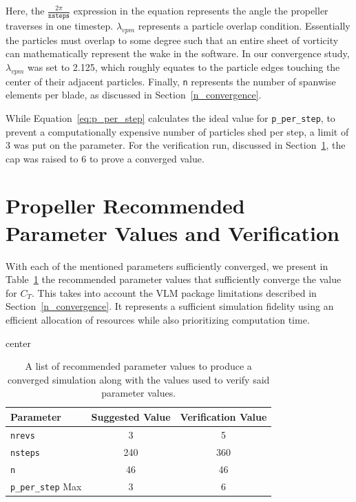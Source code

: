 \documentclass{report}
\begin{document}
Here, the $\frac{2 \pi}{\texttt{nsteps}}$ expression in the equation represents the angle the propeller traverses in one timestep.
$\lambda_{vpm}$ represents a particle overlap condition. Essentially the particles must overlap to some degree such that an entire sheet of vorticity can mathematically represent the wake in the software.
In our convergence study, $\lambda_{vpm}$ was set to 2.125, which roughly equates to the particle edges touching the center of their adjacent particles.
Finally, \texttt{n} represents the number of spanwise elements per blade, as discussed in Section~\ref{n_convergence}.

While Equation~\ref{eq:p_per_step} calculates the ideal value for \texttt{p\_per\_step}, to prevent a computationally expensive number of particles shed per step, a limit of 3 was put on the parameter.
For the verification run, discussed in Section~\ref{Verification}, the cap was raised to 6 to prove a converged value. 

\section{Propeller Recommended Parameter Values and Verification}\label{Verification}
With each of the mentioned parameters sufficiently converged, we present in Table~\ref{tab:suggested} the recommended parameter values that sufficiently converge the value for $C_T$.
This takes into account the VLM package limitations described in Section~\ref{n_convergence}. It represents a sufficient simulation fidelity using an efficient allocation of resources while also prioritizing computation time.
\begin{table}[H]
    \centering
    \caption{A list of recommended parameter values to produce a converged simulation along with the values used to verify said parameter values.}\label{tab:suggested}
    \begin{adjustbox}{center}
    \begin{tabular}{l c c}
        \toprule
        \textbf{Parameter} & \textbf{Suggested Value} & \textbf{Verification Value} \\
        \midrule
        \texttt{nrevs} & 3 &  5 \\
        \texttt{nsteps} & 240 & 360 \\
        \texttt{n} & 46  & 46 \\
        \texttt{p\_per\_step} Max & 3 & 6 \\
        \bottomrule
    \end{tabular}
    \end{adjustbox}
\end{table}
\end{document}
